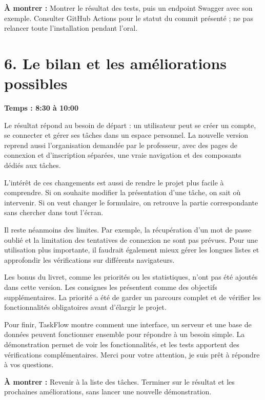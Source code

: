 \documentclass[11pt,a4paper]{article}
\newcommand{\partie}[2]{\section*{\textcolor{forest}{#1}}\textbf{Temps : #2}\par}
\newcommand{\action}[1]{\par\textcolor{muted}{\textbf{À montrer :} #1}\par}
\begin{document}
\action{Montrer le résultat des tests, puis un endpoint Swagger avec son exemple. Consulter GitHub Actions pour le statut du commit présenté ; ne pas relancer toute l'installation pendant l'oral.}

\newpage
\partie{6. Le bilan et les améliorations possibles}{8:30 à 10:00}

Le résultat répond au besoin de départ : un utilisateur peut se créer un compte, se connecter et gérer ses tâches dans un espace personnel. La nouvelle version reprend aussi l'organisation demandée par le professeur, avec des pages de connexion et d'inscription séparées, une vraie navigation et des composants dédiés aux tâches.

L'intérêt de ces changements est aussi de rendre le projet plus facile à comprendre. Si on souhaite modifier la présentation d'une tâche, on sait où intervenir. Si on veut changer le formulaire, on retrouve la partie correspondante sans chercher dans tout l'écran.

Il reste néanmoins des limites. Par exemple, la récupération d'un mot de passe oublié et la limitation des tentatives de connexion ne sont pas prévues. Pour une utilisation plus importante, il faudrait également mieux gérer les longues listes et approfondir les vérifications sur différents navigateurs.

Les bonus du livret, comme les priorités ou les statistiques, n'ont pas été ajoutés dans cette version. Les consignes les présentent comme des objectifs supplémentaires. La priorité a été de garder un parcours complet et de vérifier les fonctionnalités obligatoires avant d'élargir le projet.

Pour finir, TaskFlow montre comment une interface, un serveur et une base de données peuvent fonctionner ensemble pour répondre à un besoin simple. La démonstration permet de voir les fonctionnalités, et les tests apportent des vérifications complémentaires. Merci pour votre attention, je suis prêt à répondre à vos questions.

\action{Revenir à la liste des tâches. Terminer sur le résultat et les prochaines améliorations, sans lancer une nouvelle démonstration.}

\newpage
\end{document}

